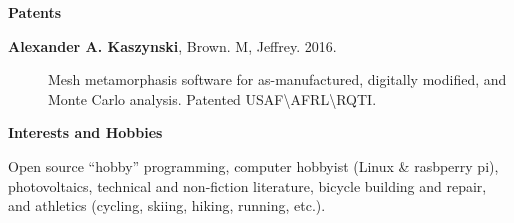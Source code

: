 \documentclass[letterpaper,11pt]{article}
\newcommand{\resheading}[1]{{\large \colorbox{mygrey}{\begin{minipage}{\textwidth}{\textbf{#1 \vphantom{p\^{E}}}}\end{minipage}}}}
\begin{document}
\resheading{Patents}
\begin{description}
\item[\textbf{Alexander A. Kaszynski}, Brown. M, Jeffrey.  2016.]
Mesh metamorphasis software for as-manufactured, digitally modified, and Monte Carlo analysis.
Patented USAF\textbackslash AFRL\textbackslash RQTI.
\end{description}

\resheading{Interests and Hobbies}
\begin{description}
Open source ``hobby'' programming, computer hobbyist (Linux & rasbperry pi), photovoltaics, technical and non-fiction literature, bicycle building and repair, and athletics (cycling, skiing, hiking, running, etc.).
\end{description}
\end{document}
